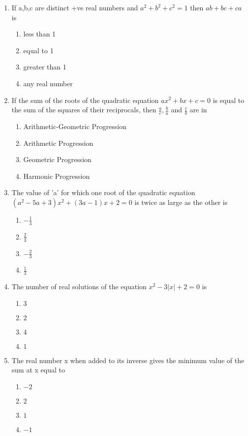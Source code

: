 \documentclass[journal,12pt,twocolumn]{IEEEtran}
\begin{document}
\begin{enumerate}[label=\arabic*]
\item If a,b,c are distinct +ve real numbers and $a^2+b^2+c^2=1$ then $ab+bc+ca$ is
\begin{enumerate}
\item less than 1
\item equal to 1 
\item greater than 1
\item any real number 
\end{enumerate}

\item If the sum of the roots of the quadratic equation $ax^2+bx+c=0$ is equal to the sum of the squares of their reciprocals, then $\frac{a}{c},\frac{b}{a}$ and $\frac{c}{b}$ are in
\begin{enumerate}
\item Arithmetic-Geometric Progression
\item Arithmetic Progression 
\item Geometric Progression
\item Harmonic Progression
\end{enumerate}

\item The value of 'a' for which one root of the quadratic equation $(a^2-5a+3)x^2+(3a-1)x+2=0$ is twice as large as the other is
\begin{enumerate}
\item $-\frac{1}{3}$
\item $\frac{2}{3}$
\item $-\frac{2}{3}$
\item $\frac{1}{3}$
\end{enumerate}

\item The number of real solutions of the equation $x^2-3|x|+2=0$ is
\begin{enumerate}
\item $3$
\item $2$ 
\item $4$
\item $1$
\end{enumerate}

\item The real number x when added to its inverse gives the minimum value of the sum at x equal to
\begin{enumerate}
\item $-2$
\item $2$ 
\item $1$
\item $-1$ 
\end{enumerate}


\end{enumerate}
\end{document}
